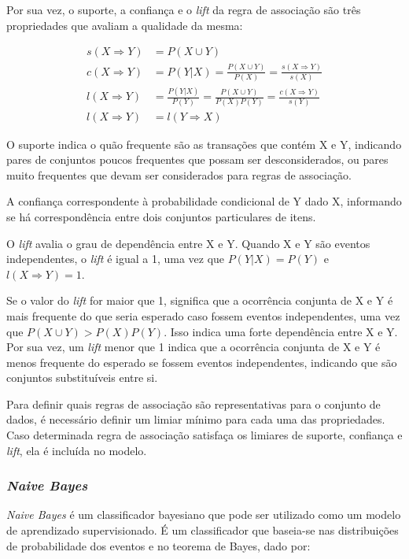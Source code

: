 Por sua vez, o suporte, a confiança e o \textit{lift} da regra de associação são três
propriedades que avaliam a qualidade da mesma:

\begin{align}
    s(X \Rightarrow Y) &= P( X \cup Y ) \\
    c(X \Rightarrow Y) &= P(Y|X) = \frac{P(X \cup Y)}{P(X)} = \frac{s(X \Rightarrow Y)}{s(X)}  \\
    l(X \Rightarrow Y) &= \frac{P(Y|X)}{P(Y)} = \frac{P(X \cup Y)}{P(X)P(Y)} = \frac{c(X \Rightarrow Y)}{s(Y)}\\
    l(X \Rightarrow Y) &= l(Y \Rightarrow X) 
\end{align}

O suporte indica o quão frequente são as transações que contém X e Y, indicando
pares de conjuntos poucos frequentes que possam ser desconsiderados, ou pares
muito frequentes que devam ser considerados para regras de associação.

A confiança correspondente à probabilidade condicional de Y dado X, informando
se há correspondência entre dois conjuntos particulares de itens.

O \textit{lift} avalia o grau de dependência entre X e Y. Quando X e Y são
eventos independentes, o \textit{lift} é igual a 1, uma vez que $P(Y|X) = P(Y)$ e $l(X
\Rightarrow Y) = 1$.

Se o valor do \textit{lift} for maior que 1, significa que a
ocorrência conjunta de X e Y é mais frequente do que seria esperado caso fossem
eventos independentes, uma vez que $P(X \cup Y) > P(X)P(Y)$. Isso indica uma
forte dependência entre X e Y. Por sua vez, um \textit{lift}  menor que 1 indica
que a ocorrência conjunta de X e Y é menos frequente do esperado se fossem
eventos independentes, indicando que são conjuntos substituíveis entre si.

Para definir quais regras de associação são representativas para o conjunto de
dados, é necessário definir um limiar mínimo para cada uma das propriedades.
Caso determinada regra de associação satisfaça os limiares de suporte,
confiança e \textit{lift}, ela é incluída no modelo.

\subsubsection{\textit{Naive Bayes}}

\textit{Naive Bayes} é um classificador bayesiano que pode ser utilizado como um
modelo de aprendizado supervisionado. É um classificador que baseia-se nas distribuições de
probabilidade dos eventos e no teorema de Bayes, dado por:

